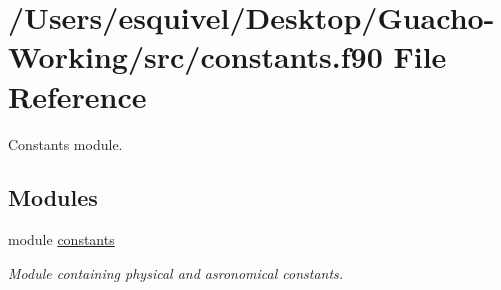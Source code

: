 \hypertarget{constants_8f90}{}\section{/\+Users/esquivel/\+Desktop/\+Guacho-\/\+Working/src/constants.f90 File Reference}
\label{constants_8f90}


Constants module.  


\subsection*{Modules}
\begin{DoxyCompactItemize}
\item 
module \hyperlink{namespaceconstants}{constants}
\begin{DoxyCompactList}\small\item\em Module containing physical and asronomical constants. \end{DoxyCompactList}\end{DoxyCompactItemize}
